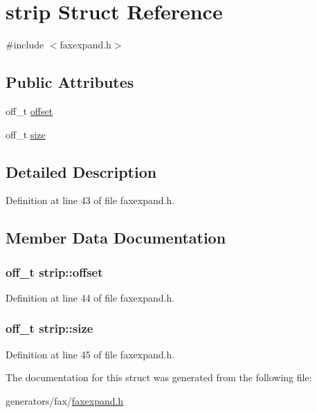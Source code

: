 \hypertarget{structstrip}{\section{strip Struct Reference}
\label{structstrip}
}


{\ttfamily \#include $<$faxexpand.\+h$>$}

\subsection*{Public Attributes}
\begin{DoxyCompactItemize}
\item 
off\+\_\+t \hyperlink{structstrip_a46209fb3c8522468b08bb7ab83dc2c6d}{offset}
\item 
off\+\_\+t \hyperlink{structstrip_ad364263a610889b0164268ae993531e8}{size}
\end{DoxyCompactItemize}


\subsection{Detailed Description}


Definition at line 43 of file faxexpand.\+h.



\subsection{Member Data Documentation}
\hypertarget{structstrip_a46209fb3c8522468b08bb7ab83dc2c6d}{
\subsubsection[{offset}]{\setlength{\rightskip}{0pt plus 5cm}off\+\_\+t strip\+::offset}}\label{structstrip_a46209fb3c8522468b08bb7ab83dc2c6d}


Definition at line 44 of file faxexpand.\+h.

\hypertarget{structstrip_ad364263a610889b0164268ae993531e8}{
\subsubsection[{size}]{\setlength{\rightskip}{0pt plus 5cm}off\+\_\+t strip\+::size}}\label{structstrip_ad364263a610889b0164268ae993531e8}


Definition at line 45 of file faxexpand.\+h.



The documentation for this struct was generated from the following file\+:\begin{DoxyCompactItemize}
\item 
generators/fax/\hyperlink{faxexpand_8h}{faxexpand.\+h}\end{DoxyCompactItemize}
